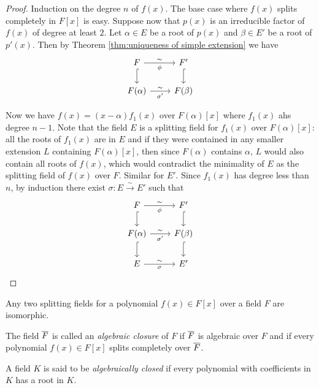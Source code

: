 \documentclass[a4paper]{article}
\begin{document}
\begin{proof}
  Induction on the degree $n$ of $f(x)$. The base case where $f(x)$ splits completely in $F[x]$ is easy. Suppose now that $p(x)$ is an irreducible factor of $f(x)$ of degree at least $2$. Let $\alpha\in E$ be a root of $p(x)$ and $\beta\in E'$ be a root of $p'(x)$. Then by Theorem \ref{thm:uniqueness of simple extension} we have
  \[
    \begin{tikzcd}
      F \arrow{r}{\sim}[swap]{\phi} \arrow[hook]{d} & F' \arrow[hook]{d}\\
      F(\alpha) \arrow{r}{\sim}[swap]{\sigma'} & F(\beta)
    \end{tikzcd}
  \]

  Now we have $f(x) = (x-\alpha)f_1(x)$ over $F(\alpha)[x]$ where $f_1(x)$ ahs degree $n-1$. Note that the field $E$ is a splitting field for $f_1(x)$ over $F(\alpha)[x]$: all the roots of $f_1(x)$ are in $E$ and if they were contained in any smaller extension $L$ containing $F(\alpha)[x]$, then since $F(\alpha)$ contains $\alpha$, $L$ would also contain all roots of $f(x)$, which would contradict the minimality of $E$ as the splitting field of $f(x)$ over $F$. Similar for $E'$. Since $f_1(x)$ has degree less than $n$, by induction there exist $\sigma: E\xrightarrow{\sim} E'$ such that
  \[
    \begin{tikzcd}
      F \arrow{r}{\sim}[swap]{\phi} \arrow[hook]{d} & F' \arrow[hook]{d}\\
      F(\alpha) \arrow{r}{\sim}[swap]{\sigma'} \arrow[hook]{d} & F(\beta) \arrow[hook]{d}\\
      E \arrow{r}{\sim}[swap]{\sigma} & E'
    \end{tikzcd}
  \]
\end{proof}

\begin{corollary}
  Any two splitting fields for a polynomial $f(x)\in F[x]$ over a field $F$ are isomorphic.
\end{corollary}

\begin{definition}
  The field $\overline{F}$ is called an \emph{algebraic closure} of $F$ if $\overline{F}$ is algebraic over $F$ and if every polynomial $f(x)\in F[x]$ splits completely over $\overline{F}$.
\end{definition}

\begin{definition}
  A field $K$ is said to be \emph{algebraically closed} if every polynomial with coefficients in $K$ has a root in $K$.
\end{definition}
\end{document}
